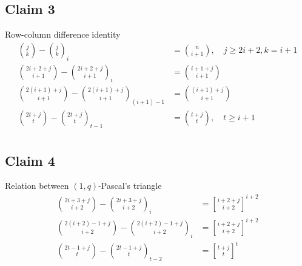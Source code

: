 \documentclass[12pt,letterpaper,oneside,reqno]{amsart}
\newcommand \rascalNumber [3] {\binom{#1}{#2}_{#3}}
\newcommand{\genstirlingI}[3]{%
    \genfrac{[}{]}{0pt}{#1}{#2}{#3}%
}
\newcommand{\oneQBinomial}[3]{\genstirlingI{}{#1}{#2}^{#3}}
\numberwithin{equation}{section}
\begin{document}
\subsection{Claim 3} Row-column difference identity
\begin{align*}
    \binom{j}{k} - \rascalNumber{j}{k}{i}                               &= \binom{n}{i+1}, \quad j \geq 2i+2, k=i+1 \\
    \binom{2i+2+j}{i+1} - \rascalNumber{2i+2+j}{i+1}{i}                 &= \binom{i+1+j}{i+1} \\
    \binom{2(i+1) +j}{i+1} - \rascalNumber{2(i+1) +j}{i+1}{(i+1)-1}     &= \binom{(i+1)+j}{i+1} \\
    \binom{2t +j}{t} - \rascalNumber{2t +j}{t}{t-1}                     &= \binom{t+j}{t}, \quad t \geq i+1 \\
\end{align*}

\subsection{Claim 4} Relation between $(1,q)$-Pascal's triangle
\begin{align*}
    \binom{2i+3+j}{i+2} - \rascalNumber{2i+3+j}{i+2}{i} &= \oneQBinomial{i+2+j}{i+2}{i+2} \\
    \binom{2(i+2)-1+j}{i+2} - \rascalNumber{2(i+2)-1+j}{i+2}{i} &= \oneQBinomial{i+2+j}{i+2}{i+2} \\
    \binom{2t-1+j}{t} - \rascalNumber{2t-1+j}{t}{t-2} &= \oneQBinomial{t+j}{t}{t} \\
\end{align*}
\end{document}
